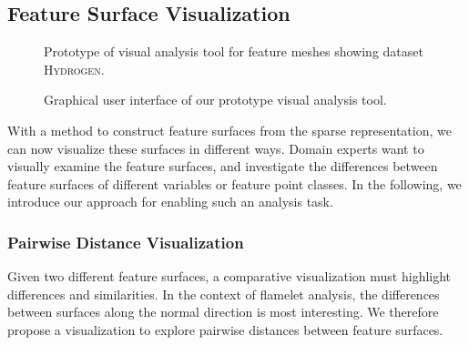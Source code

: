 \subsection{Feature Surface Visualization}
%
\begin{figure}[p]
    \centering
    \setlength\figurewidth\textwidth
    
    \caption{Prototype of visual analysis tool for feature meshes showing dataset
        \textsc{Hydrogen}.
    }
    \label{fig_contourmeshvis}
\end{figure}
%
\begin{figure}[t]
	\begin{captionbeside}{Graphical user interface of our prototype visual analysis tool.
		\label{fig:gui}}
		\setlength{}
		
	\end{captionbeside}
\end{figure}
%
With a method to construct feature surfaces from the sparse representation, we
can now visualize these surfaces in different ways.
%
Domain experts want to visually examine the feature surfaces, and investigate
the differences between feature surfaces of different variables or feature point
classes.
%
In the following, we introduce our approach for enabling such an analysis task.
%
%
\subsubsection{Pairwise Distance Visualization}
%
Given two different feature surfaces, a comparative visualization must highlight
differences and similarities.
%
In the context of flamelet analysis, the differences between surfaces along
the normal direction is most interesting.
%
We therefore propose a visualization to explore pairwise distances between
feature surfaces.
%

